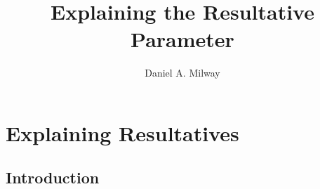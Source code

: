 \documentclass[
	12pt,
	twoside,
	narrowmargins
	]{ut-thesis}
\author{Daniel A. Milway}
\title{Explaining the Resultative Parameter}
\theoremstyle{definition}
\begin{document}
\begin{preliminary}
  \maketitle
  \tableofcontents
  \listoftables
  \listoffigures
  \listoftheorems[ignoreall,show={defn}]
\end{preliminary}
\part{Explaining Resultatives}\label{sec:part1}
\chapter{Introduction}


%
%
\end{document}
